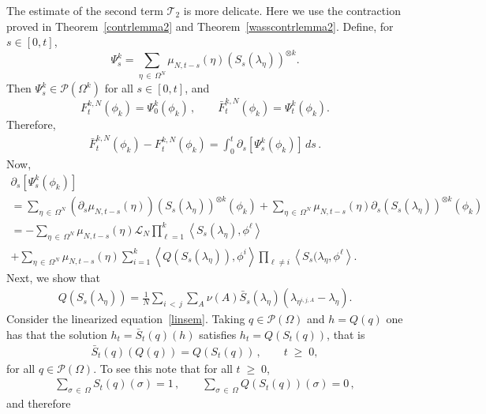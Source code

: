 \documentclass[AHL,Unicode,longabstracts,published]{cedram}
\renewcommand{\geq}{\;\geqslant\;}
\newcommand{\Om}{\Omega}
\newcommand{\cL}{\mathcal{L}}
\newcommand{\cP}{\mathcal{P}}
\newcommand{\cT}{\mathcal{T}}
\let\l=\lambda
\let\O=\Omega
\begin{document}
The estimate of the second term $\cT_2$ is more delicate. Here we use the contraction proved in Theorem~\ref{contrlemma2} and Theorem~\ref{wasscontrlemma2}. Define, for $s\in[0,t]$,
\[
\Psi^k_s = \sum_{\eta\,\in\,\O^N}\mu_{N,t-s}(\eta)(S_s(\l_{\eta}))^{\otimes k}.
\]
Then $\Psi^k_s\in\cP(\O^k)$ for all $s\in[0,t]$, and
\[
F_t^{k,N}(\phi_k)=\Psi^k_0(\phi_k)\,,\qquad \bar{F}_t^{k,N}(\phi_k)=\Psi^k_t(\phi_k).
\]
Therefore,
\begin{align}\label{eq:inpri}
\bar{F}_t^{k,N}(\phi_k) -F_t^{k,N}(\phi_k)= \int_0^t \partial_s \left[\Psi^k_s(\phi_k)\right] \,ds\,.
\end{align}
Now,
\begin{multline}\label{eq:inpria}
 \partial_s \left[\Psi^k_s(\phi_k)\right]\\
 =\sum_{\eta\,\in\,\O^N} (\partial_s\mu_{N,t-s}(\eta)) (S_s(\l_{\eta}))^{\otimes k}(\phi_k)
 + \sum_{\eta\,\in\,\O^N} \mu_{N,t-s}(\eta)\partial_s (S_s(\l_{\eta}))^{\otimes k}(\phi_k)\\
= -\sum_{\eta\,\in\,\O^N} \mu_{N,t-s}(\eta)\cL_N\prod_{\ell=1}^k\left\langle S_s(\l_{\eta}),\phi^\ell\right\rangle\\
 +
\sum_{\eta\,\in\,\O^N} \mu_{N,t-s}(\eta)
\sum_{i=1}^k\left\langle Q(S_s(\l_{\eta})),\phi^i\right\rangle\prod_{\ell\neq i}\left\langle S_s(\l_{\eta},\phi^\ell\right\rangle.
\end{multline}
Next, we show that
\begin{align}\label{eq:lintos}
Q(S_s(\l_{\eta})) =\frac1{N} \sum_{i\,<\,j}\sum_A\nu(A)\bar S_s(\l_\eta)\left(\l_{\eta^{i,j,A}} -\l_{\eta}\right).
\end{align}
Consider the linearized equation~\eqref{linsem}. Taking $q\in\cP(\O)$ and $h= Q(q)$ one has that the solution $h_t=\bar S_t(q)(h)$ satisfies $h_t = Q\left(S_t(q)\right)$, that is
\begin{align}\label{eq:qqq}
\bar S_t(q)(Q(q)) = Q\left(S_t(q)\right)\,,\qquad t\geq 0,
\end{align}
for all $q\in\cP(\O)$. To see this note that for all $t\geq 0$,
\begin{align*}
\sum_{\sigma\, \in\,\Om}S_t(q)(\sigma) = 1\,,\qquad \sum_{\sigma\,\in\,\Om}Q(S_t(q))(\sigma) = 0\,,
\end{align*}
and therefore
\end{document}
